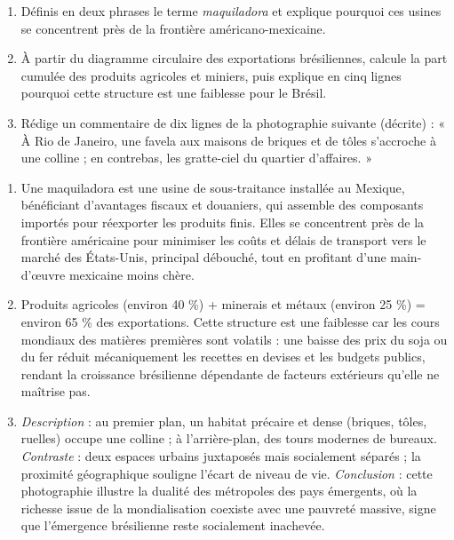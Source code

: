 \documentclass[11pt]{article}
\begin{document}
\begin{exercice}
\begin{enumerate}
\item Définis en deux phrases le terme \emph{maquiladora} et explique pourquoi ces usines se concentrent près de la frontière américano-mexicaine.
\item À partir du diagramme circulaire des exportations brésiliennes, calcule la part cumulée des produits agricoles et miniers, puis explique en cinq lignes pourquoi cette structure est une faiblesse pour le Brésil.
\item Rédige un commentaire de dix lignes de la photographie suivante (décrite) : « À Rio de Janeiro, une favela aux maisons de briques et de tôles s'accroche à une colline ; en contrebas, les gratte-ciel du quartier d'affaires. »
\end{enumerate}
\end{exercice}

\begin{corrige}[Exercice]
\begin{enumerate}
\item Une maquiladora est une usine de sous-traitance installée au Mexique, bénéficiant d'avantages fiscaux et douaniers, qui assemble des composants importés pour réexporter les produits finis. Elles se concentrent près de la frontière américaine pour minimiser les coûts et délais de transport vers le marché des États-Unis, principal débouché, tout en profitant d'une main-d'œuvre mexicaine moins chère.
\item Produits agricoles (environ 40 \%) + minerais et métaux (environ 25 \%) = environ 65 \% des exportations. Cette structure est une faiblesse car les cours mondiaux des matières premières sont volatils : une baisse des prix du soja ou du fer réduit mécaniquement les recettes en devises et les budgets publics, rendant la croissance brésilienne dépendante de facteurs extérieurs qu'elle ne maîtrise pas.
\item \emph{Description} : au premier plan, un habitat précaire et dense (briques, tôles, ruelles) occupe une colline ; à l'arrière-plan, des tours modernes de bureaux. \emph{Contraste} : deux espaces urbains juxtaposés mais socialement séparés ; la proximité géographique souligne l'écart de niveau de vie. \emph{Conclusion} : cette photographie illustre la dualité des métropoles des pays émergents, où la richesse issue de la mondialisation coexiste avec une pauvreté massive, signe que l'émergence brésilienne reste socialement inachevée.
\end{enumerate}
\end{corrige}
\end{document}
